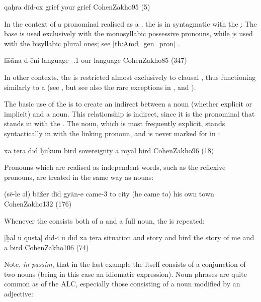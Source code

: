 {qaḥra dīd-ox}
{grief \masc}
{your grief}
{CohenZakho}{95 (5)}

In the context of a pronominal \secn realised as a , the \lnk* is in syntagmatic  with the  \lnk* \d:  The base  is used exclusively with the monosyllabic \sg* possessive pronouns, while \d is used with the bisyllabic plural ones; see \vref{tb:Amd_gen_pron} \citep[453]{CohenZakho}.

{līšāna d-ēni}
{language \lnk-\poss.1\pl}
{our language}
{CohenZakho}{85 (347)}


 In other contexts, the  \d is restricted almost exclusively to clausal \secns, thus functioning similarly to a \rel* (see , but see also the rare exceptions in ,  and ). 




The basic use of the \lnk* is to create an indirect  between a \prim noun (whether explicit or implicit) and a \secn noun. This relationship is indirect, since it is the pronominal \lnk* that stands in  with the \secn. The \prim noun, which is most frequently explicit, stands syntactically in  with the linking pronoun, and is never marked for \cst* in \JZax:

	{xa ṭēra dīd ḥukūm}
{\indef{} bird \lnkd{} sovereignty}
{a royal bird}
{CohenZakho}{96 (18)}




Pronouns which are realised as independent words, such as the reflexive pronouns, are treated in the same way as
nouns:



{(sē-le əl) bāžer dīd gyān-e}
{came-3\masc{} to city \lnkd{} \masc}
{(he came to) his own town}
{CohenZakho}{132 (176)}

Whenever the \secn consists both of a  and a full noun, the \lnk* is repeated:



{[ḥāl ū\cb{} quṣta] dīd-i ū\cb{} dīd xa ṭēra}
{situation and\cb{} story \sg{} and\cb{} \lnkd{} \indef{} bird}
{the story of me and a bird}
{CohenZakho}{106 (74)}

\largerpage[-1]
Note, \textit{in passim}, that in the last example the \prim itself consists of a conjunction of two nouns (being in this case an idiomatic expression). Noun phrases are quite common as \prims of the ALC, especially those consisting of a noun modified by an adjective:


